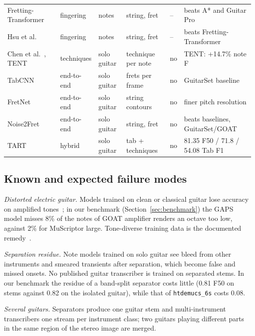 \begin{table}[t]
\begin{tabular}{@{}llllll@{}}
Fretting-Transformer~\cite{hamberger2025fretting} & fingering & notes & string, fret & -- & beats A* and Guitar Pro \\
Hsu et al.~\cite{hsu2026noteevent} & fingering & notes & string, fret & -- & beats Fretting-Transformer \\
Chen et al.~\cite{chen2015technique}, TENT~\cite{su2019tent} & techniques & solo guitar & technique per note & no & TENT: +14.7\% note F \\
TabCNN~\cite{wiggins2019tabcnn} & end-to-end & solo guitar & frets per frame & no & GuitarSet baseline \\
FretNet~\cite{cwitkowitz2023fretnet} & end-to-end & solo guitar & string contours & no & finer pitch resolution \\
Noise2Fret~\cite{simionato2026noise2fret} & end-to-end & solo guitar & string, fret & no & beats baselines, GuitarSet/GOAT \\
TART~\cite{gupta2026tart} & hybrid & solo guitar & tab + techniques & no & 81.35 F50 / 71.8 / 54.08 Tab F1 \\
\bottomrule
\end{tabular}
\end{table}

\subsection{Known and expected failure modes}
\emph{Distorted electric guitar.} Models trained on clean or classical guitar
lose accuracy on amplified tones~\cite{chen2022egdb}; in our benchmark
(Section~\ref{sec:benchmark}) the GAPS model misses 8\% of the notes of GOAT
amplifier renders an octave too low, against 2\% for MuScriptor large.
Tone-diverse training data is the documented
remedy~\cite{chen2025egdbpg,pedroza2024tones}.

\emph{Separation residue.} Note models trained on solo guitar see bleed from
other instruments and smeared transients after separation, which become
false and missed onsets. No published guitar transcriber is trained on
separated stems. In our benchmark the residue of a band-split separator costs
little (0.81 F50 on stems against 0.82 on the isolated guitar), while that of
\texttt{htdemucs\_6s} costs 0.08.

\emph{Several guitars.} Separators produce one guitar stem and
multi-instrument transcribers one stream per instrument class; two guitars
playing different parts in the same region of the stereo image are merged.

